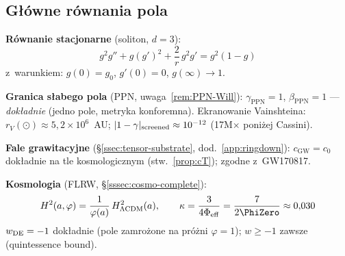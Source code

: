 \subsection*{G\l{}\'owne r\'ownania pola}

\noindent\textbf{R\'ownanie stacjonarne} (soliton, $d=3$):
\begin{equation}
g^2 g'' + g(g')^2 + \frac{2}{r}\,g^2 g' = g^2(1 - g)
\end{equation}
z~warunkiem: $g(0) = g_0$, $g'(0) = 0$, $g(\infty) \to 1$.

\smallskip\noindent
{}

\noindent\textbf{Granica s\l{}abego pola} (PPN, uwaga~\ref{rem:PPN-Will}):
$\gamma_{\mathrm{PPN}} = 1$,\;
$\beta_{\mathrm{PPN}} = 1$ --- \emph{dok\l{}adnie}
(jedno pole, metryka konforemna).
Ekranowanie Vainshteina: $r_V(\odot) \approx 5{,}2\times 10^6$~AU;
$|1-\gamma|_{\rm screened} \approx 10^{-12}$ (17M$\times$ poni\.zej Cassini).

\noindent\textbf{Fale grawitacyjne} (\S\ref{ssec:tensor-substrate}, dod.~\ref{app:ringdown}):
$c_{\mathrm{GW}} = c_0$ dok\l{}adnie na tle kosmologicznym
(stw.~\ref{prop:cT}); zgodne z~GW170817.

\noindent\textbf{Kosmologia} (FLRW, \S\ref{sssec:cosmo-complete}):
\begin{equation}
H^2(a,\varphi) = \frac{1}{\varphi(a)}\,H^2_{\Lambda\mathrm{CDM}}(a),
\qquad
\kappa = \frac{3}{4\Phi_{\mathrm{eff}}} = \frac{7}{2\PhiZero} \approx 0{,}030
\end{equation}
$w_{\rm DE} = -1$ dok\l{}adnie (pole zamro\.zone na pr\'o\.zni
$\varphi = 1$); $w \geq -1$ zawsze (quintessence bound).

